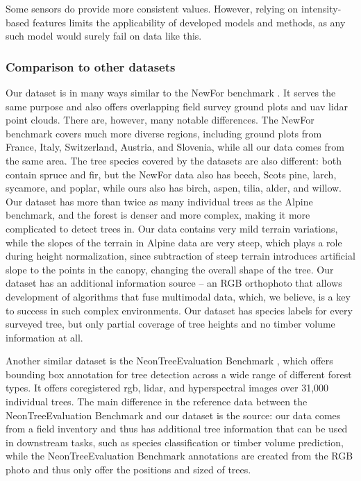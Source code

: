 Some sensors do provide more consistent values.
However, relying on intensity-based features limits the applicability of developed models and methods, as any such model would surely fail on data like this.

\subsubsection{Comparison to other datasets}

Our dataset is in many ways similar to the NewFor benchmark \cite{eysnAlpineITDBenchmark2015}.
It serves the same purpose and also offers overlapping field survey ground plots and \gls{uav} \gls{lidar} point clouds.
There are, however, many notable differences.
The NewFor benchmark covers much more diverse regions, including ground plots from France, Italy, Switzerland, Austria, and Slovenia, while all our data comes from the same area.
The tree species covered by the datasets are also different: both contain spruce and fir, but the NewFor data also has beech, Scots pine, larch, sycamore, and poplar, while ours also has birch, aspen, tilia, alder, and willow.
Our dataset has more than twice as many individual trees as the Alpine benchmark, and the forest is denser and more complex, making it more complicated to detect trees in.
Our data contains very mild terrain variations, while the slopes of the terrain in Alpine data are very steep, which plays a role during height normalization, since subtraction of steep terrain introduces artificial slope to the points in the canopy, changing the overall shape of the tree.
Our dataset has an additional information source – an RGB orthophoto that allows development of algorithms that fuse multimodal data, which, we believe, is a key to success in such complex environments.
Our dataset has species labels for every surveyed tree, but only partial coverage of tree heights and no timber volume information at all.

Another similar dataset is the NeonTreeEvaluation Benchmark \cite{weinsteinDataNeonTreeEvaluationBenchmark2022}, which offers bounding box annotation for tree detection across a wide range of different forest types.
It offers coregistered \gls{rgb}, \gls{lidar}, and hyperspectral images over 31,000 individual trees.
The main difference in the reference data between the NeonTreeEvaluation Benchmark and our dataset is the source: our data comes from a field inventory and thus has additional tree information that can be used in downstream tasks, such as species classification or timber volume prediction, while the NeonTreeEvaluation Benchmark annotations are created from the RGB photo and thus only offer the positions and sized of trees.

